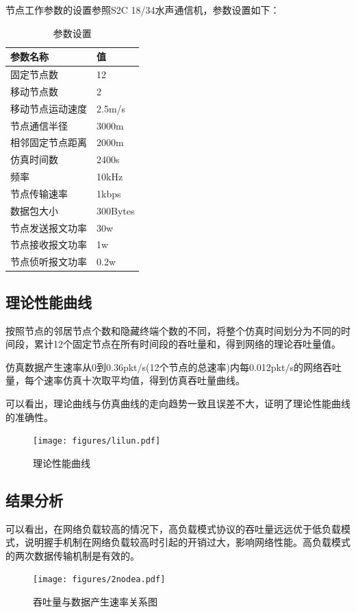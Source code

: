 节点工作参数的设置参照S2C 18/34水声通信机，参数设置如下：
\begin{table}[!htp]
	\centering
\caption{参数设置}
\begin{tabular}{m{5cm}<{\centering} m{5cm}<{\centering}}%
	\hline  %
    参数名称& 值\\
	\hline  
	固定节点数& 12\\
	移动节点数& 2\\
	移动节点运动速度& 2.5m/s\\
	节点通信半径& 3000m\\
	相邻固定节点距离& 2000m\\
	仿真时间数& 2400s\\
	频率& 10kHz\\			
	节点传输速率& 1kbps\\
	数据包大小& 300Bytes\\
	节点发送报文功率& 30w\\				
	节点接收报文功率& 1w\\
	节点侦听报文功率& 0.2w\\
	\hline 		
\end{tabular}
\label{tab2}
\end{table}

\subsection{理论性能曲线}
按照节点的邻居节点个数和隐藏终端个数的不同，将整个仿真时间划分为不同的时间段，累计12个固定节点在所有时间段的吞吐量和，得到网络的理论吞吐量值。

仿真数据产生速率从0到0.36pkt/s(12个节点的总速率)内每0.012pkt/s的网络吞吐量，每个速率仿真十次取平均值，得到仿真吞吐量曲线。

可以看出，理论曲线与仿真曲线的走向趋势一致且误差不大，证明了理论性能曲线的准确性。
\begin{figure}[!ht]
	\centering
	\texttt{[image: figures/lilun.pdf]}
	\caption{
		理论性能曲线
	}
	\label{fig:example}
\end{figure}

\subsection{结果分析}
可以看出，在网络负载较高的情况下，高负载模式协议的吞吐量远远优于低负载模式，说明握手机制在网络负载较高时引起的开销过大，影响网络性能。高负载模式的两次数据传输机制是有效的。
\begin{figure}[!ht]
	\centering
	\texttt{[image: figures/2nodea.pdf]}
	\caption{
		吞吐量与数据产生速率关系图
	}
	\label{fig:example}
\end{figure}

